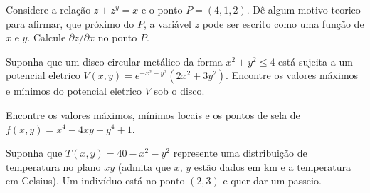 \documentclass[11pt]{exam}
\begin{document}
 \begin{questions} 
     
     \question[20] Considere a relação $z+z^{y}=x$ e o ponto $P=(4,1,2)$.
     Dê algum motivo teorico para afirmar, que próximo do $P$, a variável $z$ pode ser escrito como uma função de $x$ e $y$. Calcule $\partial z/\partial x$
     no ponto $P$.
     
     \question[20] 
      
    \question[30] Suponha que um disco circular metálico da forma $x^{2}+y^{2}\leq 4$ está sujeita a um potencial eletrico $V(x,y)=e^{-x^{2}-y^{2}}(2x^{2}+3y^{2})$. Encontre os valores máximos e mínimos do potencial eletrico $V$ sob o disco. 
        
  \question Encontre os valores máximos, mínimos locais e os
  pontos de sela de $f(x,y)=x^{4}-4xy+y^{4}+1$. 
   
   \question Suponha que $T(x,y)=40-x^{2}-y^{2}$ represente uma distribuição de temperatura no plano $xy$ (admita que $x$, 
   $y$ estão dados em km e a temperatura em Celsius).  
   Um indivíduo está no ponto $(2,3)$ e quer dar um passeio. 
   \begin{parts}

\end{parts}
\end{questions}
\end{document}
